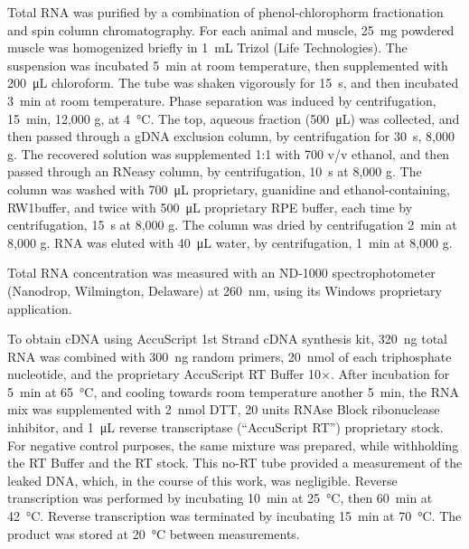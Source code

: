 \documentclass[12pt,english]{report}\usepackage[]{graphicx}\usepackage[]{color}
\begin{document}
Total RNA was purified by a combination of phenol-chlorophorm fractionation
and spin column chromatography. For each animal and muscle, \SI{25}{\milli\gram}
powdered muscle was homogenized briefly in \SI{1}{\milli\liter} Trizol
(Life Technologies). The suspension was incubated \SI{5}{\minute}
at room temperature, then supplemented with \SI{200}{\micro\liter}
chloroform. The tube was shaken vigorously for \SI{15}{\second},
and then incubated \SI{3}{\minute} at room temperature. Phase separation
was induced by centrifugation, \SI{15}{\minute}, 12,000 g, at \SI{4}{\celsius}.
The top, aqueous fraction (\SI{500}{\micro\liter}) was collected,
and then passed through a gDNA exclusion column, by centrifugation
for \SI{30}{\second}, 8,000 g. The recovered solution was supplemented
1:1 with \SI{700}{\promille} v/v ethanol, and then passed through
an RNeasy column, by centrifugation, \SI{10}{\second} at 8,000 g.
The column was washed with \SI{700}{\micro\liter} proprietary, guanidine
and ethanol-containing, RW1buffer, and twice with \SI{500}{\micro\liter}
proprietary RPE buffer, each time by centrifugation, \SI{15}{\second}
at 8,000 g. The column was dried by centrifugation \SI{2}{\minute}
at 8,000 g. RNA was eluted with \SI{40}{\micro\liter} water, by centrifugation,
\SI{1}{\minute} at 8,000 g.

Total RNA concentration was measured with an ND-1000 spectrophotometer
(Nanodrop, Wilmington, Delaware) at \SI{260}{\nano\meter}, using
its Windows proprietary application.

To obtain cDNA using AccuScript 1st Strand cDNA synthesis kit, \SI{320}{\nano\gram}
total RNA was combined with \SI{300}{\nano\gram} random primers,
\SI{20}{\nano\mole} of each triphosphate nucleotide, and the proprietary
AccuScript RT Buffer 10×. After incubation for \SI{5}{\minute} at
\SI{65}{\celsius}, and cooling towards room temperature another \SI{5}{\minute},
the RNA mix was supplemented with \SI{2}{\nano\mole} DTT, 20 units
RNAse Block ribonuclease inhibitor, and \SI{1}{\micro\liter} reverse
transcriptase (“AccuScript RT”) proprietary stock. For negative control
purposes, the same mixture was prepared, while withholding the RT
Buffer and the RT stock. This no-RT tube provided a measurement of
the leaked DNA, which, in the course of this work, was negligible.
Reverse transcription was performed by incubating \SI{10}{\minute}
at \SI{25}{\celsius}, then \SI{60}{\minute} at \SI{42}{\celsius}.
Reverse transcription was terminated by incubating \SI{15}{\minute}
at \SI{70}{\celsius}. The product was stored at \SI{20}{\celsius}
between measurements.
\end{document}
